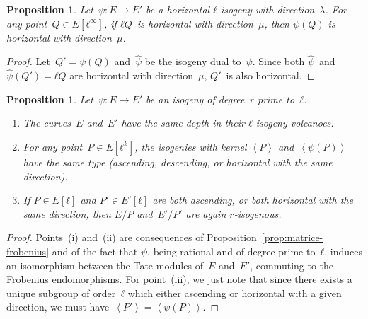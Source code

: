 \documentclass{lms}
\newtheorem{prop}[thm]{Proposition}
\def\chev#1{\left\langle#1\right\rangle}
\begin{document}
\begin{prop}\label{prop:push-horizontal}
Let~$ψ: E → E'$ be a horizontal $ℓ$-isogeny with direction~$λ$.
For any point~$Q ∈ E[ℓ^∞]$,
if $ℓ Q$~is horizontal with direction~$μ$,
then $ψ(Q)$ is horizontal with direction~$μ$.
\end{prop}
\begin{proof}
Let~$Q' = ψ(Q)$ and~$\widehat{ψ}$ be the isogeny dual to~$ψ$.
Since both $\widehat{ψ}$~and~$\widehat{ψ}(Q') = ℓ Q$ are horizontal
with direction~$μ$, $Q'$~is also horizontal.
\end{proof}
\begin{prop}\label{prop:parallel}
Let~$ψ: E → E'$ be an isogeny of degree~$r$ prime to~$ℓ$.
\begin{enumerate}
\item The curves~$E$ and~$E'$ have the same depth
in their $ℓ$-isogeny volcanoes.
\item\label{prop:parallel:func} For any point~$P ∈ E[ℓ^k]$,
the isogenies with kernel $\chev{P}$ and~$\chev{ψ(P)}$ have the same type
(ascending, descending, or horizontal with the same direction).
\item\label{prop:parallel:ascent} If $P ∈ E[ℓ]$ and $P' ∈ E'[ℓ]$ are both ascending,
or both horizontal with the same direction,
then $E/P$ and~$E'/P'$ are again $r$-isogenous.
\end{enumerate}
\end{prop}
\begin{proof}
Points~(i) and~(ii) are consequences of Proposition~\ref{prop:matrice-frobenius}
and of the fact that $ψ$, being rational and of degree prime to~$ℓ$,
induces an isomorphism between the Tate modules of~$E$ and~$E'$,
commuting to the Frobenius endomorphisms.
For point~(iii), we just note that
since there exists a unique subgroup of order~$ℓ$ which
either ascending or horizontal with a given direction,
we must have~$\chev{P'} = \chev{ψ(P)}$.
\end{proof}

\end{document}
